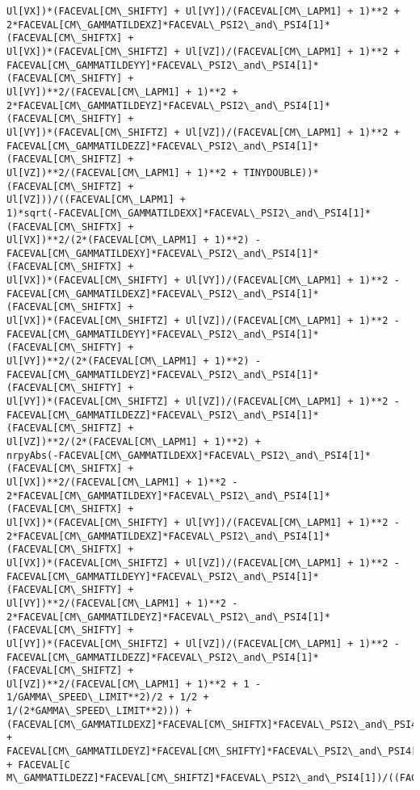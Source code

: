 \documentclass[landscape,letterpaper,10pt,english]{article}
\begin{document}
\begin{Verbatim}[commandchars=\\\{\}]
Ul[VX])*(FACEVAL[CM\_SHIFTY] + Ul[VY])/(FACEVAL[CM\_LAPM1] + 1)**2 +
2*FACEVAL[CM\_GAMMATILDEXZ]*FACEVAL\_PSI2\_and\_PSI4[1]*(FACEVAL[CM\_SHIFTX] +
Ul[VX])*(FACEVAL[CM\_SHIFTZ] + Ul[VZ])/(FACEVAL[CM\_LAPM1] + 1)**2 +
FACEVAL[CM\_GAMMATILDEYY]*FACEVAL\_PSI2\_and\_PSI4[1]*(FACEVAL[CM\_SHIFTY] +
Ul[VY])**2/(FACEVAL[CM\_LAPM1] + 1)**2 +
2*FACEVAL[CM\_GAMMATILDEYZ]*FACEVAL\_PSI2\_and\_PSI4[1]*(FACEVAL[CM\_SHIFTY] +
Ul[VY])*(FACEVAL[CM\_SHIFTZ] + Ul[VZ])/(FACEVAL[CM\_LAPM1] + 1)**2 +
FACEVAL[CM\_GAMMATILDEZZ]*FACEVAL\_PSI2\_and\_PSI4[1]*(FACEVAL[CM\_SHIFTZ] +
Ul[VZ])**2/(FACEVAL[CM\_LAPM1] + 1)**2 + TINYDOUBLE))*(FACEVAL[CM\_SHIFTZ] +
Ul[VZ]))/((FACEVAL[CM\_LAPM1] +
1)*sqrt(-FACEVAL[CM\_GAMMATILDEXX]*FACEVAL\_PSI2\_and\_PSI4[1]*(FACEVAL[CM\_SHIFTX] +
Ul[VX])**2/(2*(FACEVAL[CM\_LAPM1] + 1)**2) -
FACEVAL[CM\_GAMMATILDEXY]*FACEVAL\_PSI2\_and\_PSI4[1]*(FACEVAL[CM\_SHIFTX] +
Ul[VX])*(FACEVAL[CM\_SHIFTY] + Ul[VY])/(FACEVAL[CM\_LAPM1] + 1)**2 -
FACEVAL[CM\_GAMMATILDEXZ]*FACEVAL\_PSI2\_and\_PSI4[1]*(FACEVAL[CM\_SHIFTX] +
Ul[VX])*(FACEVAL[CM\_SHIFTZ] + Ul[VZ])/(FACEVAL[CM\_LAPM1] + 1)**2 -
FACEVAL[CM\_GAMMATILDEYY]*FACEVAL\_PSI2\_and\_PSI4[1]*(FACEVAL[CM\_SHIFTY] +
Ul[VY])**2/(2*(FACEVAL[CM\_LAPM1] + 1)**2) -
FACEVAL[CM\_GAMMATILDEYZ]*FACEVAL\_PSI2\_and\_PSI4[1]*(FACEVAL[CM\_SHIFTY] +
Ul[VY])*(FACEVAL[CM\_SHIFTZ] + Ul[VZ])/(FACEVAL[CM\_LAPM1] + 1)**2 -
FACEVAL[CM\_GAMMATILDEZZ]*FACEVAL\_PSI2\_and\_PSI4[1]*(FACEVAL[CM\_SHIFTZ] +
Ul[VZ])**2/(2*(FACEVAL[CM\_LAPM1] + 1)**2) +
nrpyAbs(-FACEVAL[CM\_GAMMATILDEXX]*FACEVAL\_PSI2\_and\_PSI4[1]*(FACEVAL[CM\_SHIFTX] +
Ul[VX])**2/(FACEVAL[CM\_LAPM1] + 1)**2 -
2*FACEVAL[CM\_GAMMATILDEXY]*FACEVAL\_PSI2\_and\_PSI4[1]*(FACEVAL[CM\_SHIFTX] +
Ul[VX])*(FACEVAL[CM\_SHIFTY] + Ul[VY])/(FACEVAL[CM\_LAPM1] + 1)**2 -
2*FACEVAL[CM\_GAMMATILDEXZ]*FACEVAL\_PSI2\_and\_PSI4[1]*(FACEVAL[CM\_SHIFTX] +
Ul[VX])*(FACEVAL[CM\_SHIFTZ] + Ul[VZ])/(FACEVAL[CM\_LAPM1] + 1)**2 -
FACEVAL[CM\_GAMMATILDEYY]*FACEVAL\_PSI2\_and\_PSI4[1]*(FACEVAL[CM\_SHIFTY] +
Ul[VY])**2/(FACEVAL[CM\_LAPM1] + 1)**2 -
2*FACEVAL[CM\_GAMMATILDEYZ]*FACEVAL\_PSI2\_and\_PSI4[1]*(FACEVAL[CM\_SHIFTY] +
Ul[VY])*(FACEVAL[CM\_SHIFTZ] + Ul[VZ])/(FACEVAL[CM\_LAPM1] + 1)**2 -
FACEVAL[CM\_GAMMATILDEZZ]*FACEVAL\_PSI2\_and\_PSI4[1]*(FACEVAL[CM\_SHIFTZ] +
Ul[VZ])**2/(FACEVAL[CM\_LAPM1] + 1)**2 + 1 - 1/GAMMA\_SPEED\_LIMIT**2)/2 + 1/2 +
1/(2*GAMMA\_SPEED\_LIMIT**2))) +
(FACEVAL[CM\_GAMMATILDEXZ]*FACEVAL[CM\_SHIFTX]*FACEVAL\_PSI2\_and\_PSI4[1] +
FACEVAL[CM\_GAMMATILDEYZ]*FACEVAL[CM\_SHIFTY]*FACEVAL\_PSI2\_and\_PSI4[1] + FACEVAL[C
M\_GAMMATILDEZZ]*FACEVAL[CM\_SHIFTZ]*FACEVAL\_PSI2\_and\_PSI4[1])/((FACEVAL[CM\_LAPM1]

\end{Verbatim}
\end{document}
